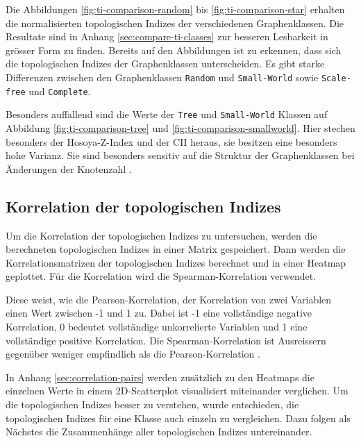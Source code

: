 Die Abbildungen \ref{fig:ti-comparison-random} bis \ref{fig:ti-comparison-star} erhalten die normalisierten topologischen Indizes der verschiedenen Graphenklassen.
Die Resultate sind in Anhang \ref{sec:compare-ti-classes} zur besseren Lesbarkeit in grösser Form zu finden.
Bereits auf den Abbildungen ist zu erkennen, dass sich die topologischen Indizes der Graphenklassen unterscheiden. Es gibt starke Differenzen zwischen den Graphenklassen \texttt{Random} und \texttt{Small-World} sowie \texttt{Scale-free} und \texttt{Complete}.

Besonders auffallend sind die Werte der \texttt{Tree} und \texttt{Small-World} Klassen auf Abbildung \ref{fig:ti-comparison-tree} und \ref{fig:ti-comparison-smallworld}. Hier stechen besonders der Hosoya-Z-Index und der CII heraus, sie besitzen eine besonders hohe Varianz. Sie sind besonders sensitiv auf die Struktur der Graphenklassen bei Änderungen der Knotenzahl \cite{furtula_structure-sensitivity_2013}.

\newpage
\subsection{Korrelation der topologischen Indizes}

Um die Korrelation der topologischen Indizes zu untersuchen, werden die berechneten topologischen Indizes in einer Matrix gespeichert.
Dann werden die Korrelationsmatrizen der topologischen Indizes berechnet und in einer Heatmap geplottet.
Für die Korrelation wird die Spearman-Korrelation \cite{spearman_proof_1904} verwendet.

Diese weist, wie die Pearson-Korrelation, der Korrelation von zwei Variablen einen Wert zwischen -1 und 1 zu. Dabei ist -1 eine vollständige negative Korrelation, 0 bedeutet vollständige unkorrelierte Variablen und 1 eine vollständige positive Korrelation. Die Spearman-Korrelation ist Ausreissern gegenüber weniger empfindlich als die Pearson-Korrelation \cite[p.~73ff]{bartl_statistik_2017}.

In Anhang \ref{sec:correlation-pairs} werden zusätzlich zu den Heatmaps die einzelnen Werte in einem 2D-Scatterplot visualisiert miteinander verglichen. Um die topologischen Indizes besser zu verstehen, wurde entschieden, die topologischen Indizes für eine Klasse auch einzeln zu vergleichen.
Dazu folgen als Nächstes die Zusammenhänge aller topologischen Indizes untereinander.

